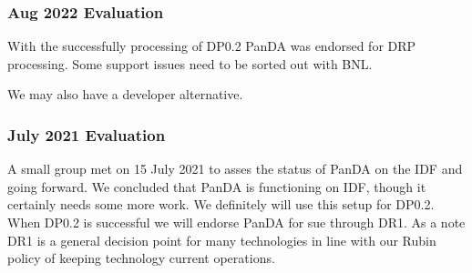 \subsubsection{Aug 2022 Evaluation}
With the successfully processing of DP0.2   PanDA was endorsed for DRP processing.
Some support issues need to be sorted out with BNL.

We may also have a developer alternative.

\subsubsection{July 2021 Evaluation}
A small group met on 15 July 2021 to asses the status of PanDA on the IDF and going forward.
We  concluded  that PanDA is functioning on IDF, though it certainly needs some more work.
We definitely will use this setup for DP0.2.
When DP0.2 is  successful we will endorse PanDA for sue  through DR1.
As a note DR1 is a general decision point for many technologies in line with our Rubin policy of keeping technology current operations.


